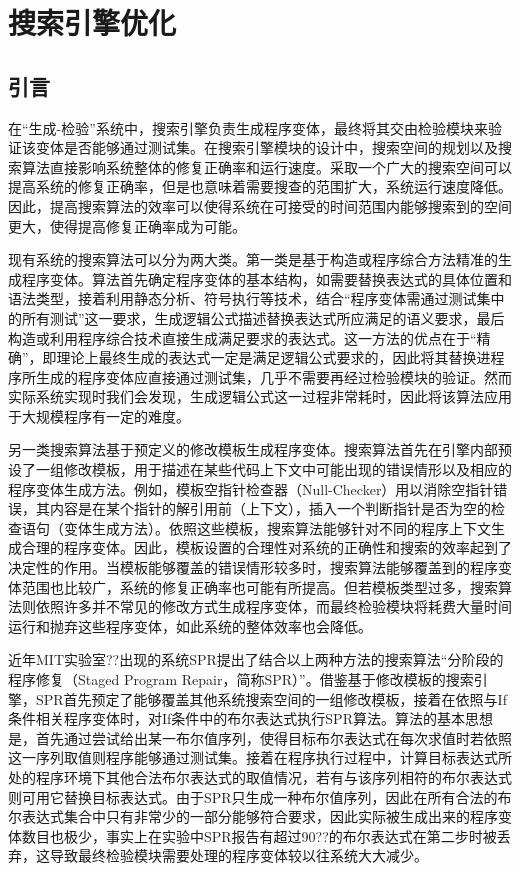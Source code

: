 \chapter{搜索引擎优化}
\label{cha:filter}
\newcommand{\SmartDebug}{
	\textbf{\textit{SmartDebug}}
}

\section{引言}%
在“生成-检验”系统中，搜索引擎负责生成程序变体，最终将其交由检验模块来验证该变体是否能够通过测试集。在搜索引擎模块的设计中，搜索空间的规划以及搜索算法直接影响系统整体的修复正确率和运行速度。采取一个广大的搜索空间可以提高系统的修复正确率，但是也意味着需要搜查的范围扩大，系统运行速度降低。因此，提高搜索算法的效率可以使得系统在可接受的时间范围内能够搜索到的空间更大，使得提高修复正确率成为可能。

现有系统的搜索算法可以分为两大类。第一类是基于构造或程序综合方法精准的生成程序变体。算法首先确定程序变体的基本结构，如需要替换表达式的具体位置和语法类型，接着利用静态分析、符号执行等技术，结合“程序变体需通过测试集中的所有测试”这一要求，生成逻辑公式描述替换表达式所应满足的语义要求，最后构造或利用程序综合技术直接生成满足要求的表达式。这一方法的优点在于“精确”，即理论上最终生成的表达式一定是满足逻辑公式要求的，因此将其替换进程序所生成的程序变体应直接通过测试集，几乎不需要再经过检验模块的验证。然而实际系统实现时我们会发现，生成逻辑公式这一过程非常耗时，因此将该算法应用于大规模程序有一定的难度。

另一类搜索算法基于预定义的修改模板生成程序变体。搜索算法首先在引擎内部预设了一组修改模板，用于描述在某些代码上下文中可能出现的错误情形以及相应的程序变体生成方法。例如，模板空指针检查器（Null-Checker）用以消除空指针错误，其内容是在某个指针的解引用前（上下文），插入一个判断指针是否为空的检查语句（变体生成方法）。依照这些模板，搜索算法能够针对不同的程序上下文生成合理的程序变体。因此，模板设置的合理性对系统的正确性和搜索的效率起到了决定性的作用。当模板能够覆盖的错误情形较多时，搜索算法能够覆盖到的程序变体范围也比较广，系统的修复正确率也可能有所提高。但若模板类型过多，搜索算法则依照许多并不常见的修改方式生成程序变体，而最终检验模块将耗费大量时间运行和抛弃这些程序变体，如此系统的整体效率也会降低。

近年MIT实验室??出现的系统SPR提出了结合以上两种方法的搜索算法“分阶段的程序修复（Staged Program Repair，简称SPR）”。借鉴基于修改模板的搜索引擎，SPR首先预定了能够覆盖其他系统搜索空间的一组修改模板，接着在依照与If条件相关程序变体时，对If条件中的布尔表达式执行SPR算法。算法的基本思想是，首先通过尝试给出某一布尔值序列，使得目标布尔表达式在每次求值时若依照这一序列取值则程序能够通过测试集。接着在程序执行过程中，计算目标表达式所处的程序环境下其他合法布尔表达式的取值情况，若有与该序列相符的布尔表达式则可用它替换目标表达式。由于SPR只生成一种布尔值序列，因此在所有合法的布尔表达式集合中只有非常少的一部分能够符合要求，因此实际被生成出来的程序变体数目也极少，事实上在实验中SPR报告有超过90??的布尔表达式在第二步时被丢弃，这导致最终检验模块需要处理的程序变体较以往系统大大减少。

